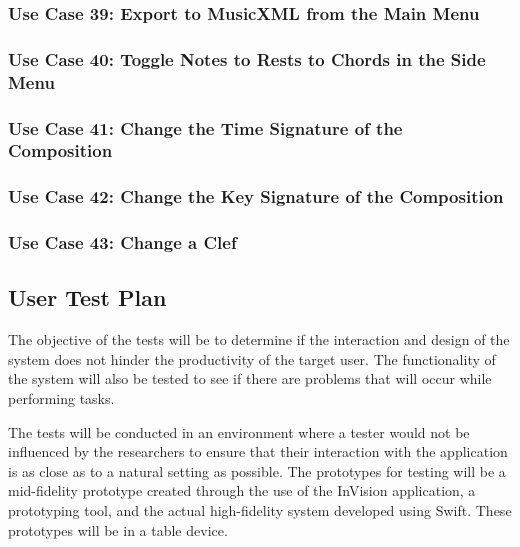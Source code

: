 \subsubsection{Use Case 39: Export to MusicXML from the Main Menu}


\subsubsection{Use Case 40: Toggle Notes to Rests to Chords in the Side Menu}


\subsubsection{Use Case 41: Change the Time Signature of the Composition}


\subsubsection{Use Case 42: Change the Key Signature of the Composition}


\subsubsection{Use Case 43: Change a Clef}


\subsection{User Test Plan}

The objective of the tests will be to determine if the interaction and design of the system does not hinder the productivity of the target user. The functionality of the system will also be tested to see if there are problems that will occur while performing tasks.

The tests will be conducted in an environment where a tester would not be influenced by the researchers to ensure that their interaction with the application is as close as to a natural setting as possible. The prototypes for testing will be a mid-fidelity prototype created through the use of the InVision application, a prototyping tool, and the actual high-fidelity system developed using Swift. These prototypes will be in a table device. 

